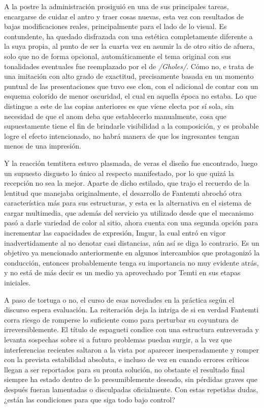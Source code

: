 \documentclass[
]{book}
\begin{document}
A la postre la administración prosiguió en una de sus principales tareas, encargarse de cuidar el antro y traer cosas nuevas, esta vez con resultados de bajas modificaciones reales, principalmente para el lado de lo visual. Es contundente, ha quedado disfrazada con una estética completamente diferente a la suya propia, al punto de ser la cuarta vez en asumir la de otro sitio de afuera, solo que no de forma opcional, automáticamente el tema original con sus tonalidades eventuales fue reemplazado por el de \emph{/Gholes/}. Cómo no, e trata de una imitación con alto grado de exactitud, precisamente basada en un momento puntual de las presentaciones que tuvo ese clon, con el adicional de contar con un esquema colorido de menor oscuridad, el cual en aquella época no estaba. Lo que distingue a este de las copias anteriores es que viene electa por sí sola, sin necesidad de que el anom deba que establecerlo manualmente, cosa que supuestamente tiene el fin de brindarle visibilidad a la composición, y es probable logre el efecto intencionado, no habrá manera de que los ingresantes tengan menos de una impresión.

Y la reacción temtitera estuvo plasmada, de veras el diseño fue encontrado, luego un supuesto disgusto lo único al respecto manifestado, por lo que quizá la recepción no sea la mejor. Aparte de dicho estilado, que trajo el recuerdo de la lentitud que manejaba originalmente, el desarrollo de Fantemti abrochó otra característica más para sus estructuras, y esta es la alternativa en el sistema de cargar multimedia, que además del servicio ya utilizado desde que el mecanismo pasó a darle variedad de color al sitio, ahora cuenta con una segunda opción para incrementar las capacidades de expresión, Imgur, la cual entró en vigor inadvertidamente al no denotar casi distancias, aún así se diga lo contrario. Es un objetivo ya mencionado anteriormente en algunos intercambios que protagonizó la conducción, entonces probablemente tenga su importancia no muy evidente atrás, y no está de más decir es un medio ya aprovechado por Temti en sus etapas iniciales.

A paso de tortuga o no, el curso de esas novedades en la práctica según el discurso espera evaluación. La reiteración deja la intriga de si en verdad Fantemti corra riesgo de romperse lo suficiente como para perturbar su coyuntura de irreversiblemente. El título de espagueti condice con una estructura entreverada y levanta sospechas sobre si a futuro problemas puedan surgir, a la vez que interferencias recientes saltaron a la vista por aparecer inesperadamente y romper con la prevista estabilidad absoluta, e incluso de vez en cuando errores críticos llegan a ser reportados para su pronta solución, no obstante el resultado final siempre ha estado dentro de lo presumiblemente deseado, sin pérdidas graves que después fueran lamentadas o disculpadas oficialmente. Con estas repetidas dudas, ¿están las condiciones para que siga todo bajo control?
\end{document}
